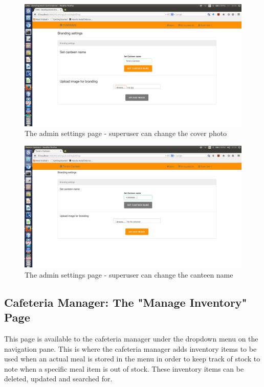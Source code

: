 \documentclass[a4paper,12pt]{report}
\begin{document}
\begin{figure}[H]
  \centering
    \includegraphics[width=1.0\textwidth]{screenshots/coverImage.png}
    \caption{The admin settings page - superuser can change the cover photo} 
\end{figure}

\begin{figure}[H]
  \centering
    \includegraphics[width=1.0\textwidth]{screenshots/canteenName.png}
    \caption{The admin settings page - superuser can change the canteen name}
\end{figure}

\subsection{Cafeteria Manager: The "Manage Inventory" Page}
This page is available to the cafeteria manager under the dropdown menu on the navigation pane. This is where the cafeteria manager adds inventory items to be used when an actual meal is stored in the menu in order to keep track of stock to note when a specific meal item is out of stock. These inventory items can be deleted, updated and searched for.
\end{document}
